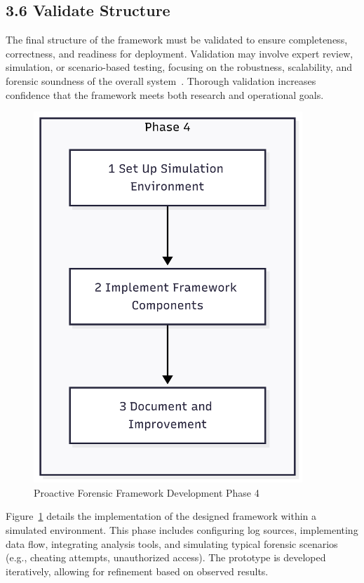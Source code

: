 \subsection{3.6 Validate Structure}

The final structure of the framework must be validated to ensure completeness, correctness, and readiness for deployment. Validation may involve expert review, simulation, or scenario-based testing, focusing on the robustness, scalability, and forensic soundness of the overall system~\cite{hevner2004design, adel2024ethicore}. Thorough validation increases confidence that the framework meets both research and operational goals.

\begin{figure}[H]
    \centering
    \includegraphics[height=14cm]{figure/framework-development-phase-4.png}
    \caption{Proactive Forensic Framework Development Phase 4}
    \label{fig:framework-development-phase-4}
\end{figure}

Figure~\ref{fig:framework-development-phase-4} details the implementation of the designed framework within a simulated environment. This phase includes configuring log sources, implementing data flow, integrating analysis tools, and simulating typical forensic scenarios (e.g., cheating attempts, unauthorized access). The prototype is developed iteratively, allowing for refinement based on observed results.

